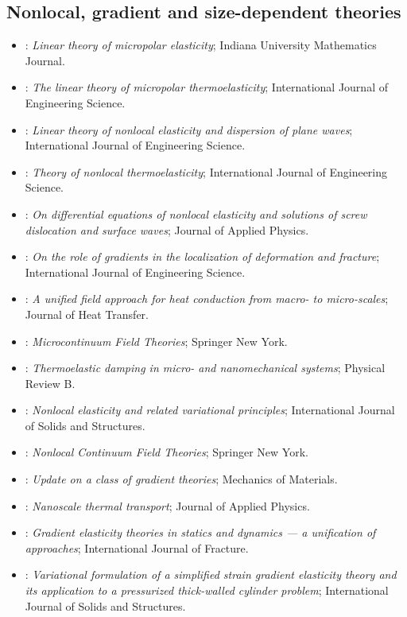 \subsection{Nonlocal, gradient and size-dependent theories}
\begin{itemize}\itemsep0pt\small
\item \citet{Eringen1966a}: \emph{Linear theory of micropolar elasticity}; Indiana University Mathematics Journal.
\item \citet{TauchertClausAriman1968}: \emph{The linear theory of micropolar thermoelasticity}; International Journal of Engineering Science.
\item \citet{Eringen1972}: \emph{Linear theory of nonlocal elasticity and dispersion of plane waves}; International Journal of Engineering Science.
\item \citet{Eringen1974}: \emph{Theory of nonlocal thermoelasticity}; International Journal of Engineering Science.
\item \citet{Eringen1983}: \emph{On differential equations of nonlocal elasticity and solutions of screw dislocation and surface waves}; Journal of Applied Physics.
\item \citet{Aifantis1992}: \emph{On the role of gradients in the localization of deformation and fracture}; International Journal of Engineering Science.
\item \citet{Tzou1995}: \emph{A unified field approach for heat conduction from macro- to micro-scales}; Journal of Heat Transfer.
\item \citet{Eringen1999}: \emph{Microcontinuum Field Theories}; Springer New York.
\item \citet{Lifshitz2000}: \emph{Thermoelastic damping in micro- and nanomechanical systems}; Physical Review B.
\item \citet{Polizzotto2001}: \emph{Nonlocal elasticity and related variational principles}; International Journal of Solids and Structures.
\item \citet{Eringen2002}: \emph{Nonlocal Continuum Field Theories}; Springer New York.
\item \citet{Aifantis2003}: \emph{Update on a class of gradient theories}; Mechanics of Materials.
\item \citet{Cahill2003}: \emph{Nanoscale thermal transport}; Journal of Applied Physics.
\item \citet{Askes2006}: \emph{Gradient elasticity theories in statics and dynamics --- a unification of approaches}; International Journal of Fracture.
\item \citet{Gao2007}: \emph{Variational formulation of a simplified strain gradient elasticity theory and its application to a pressurized thick-walled cylinder problem}; International Journal of Solids and Structures.

\end{itemize}
